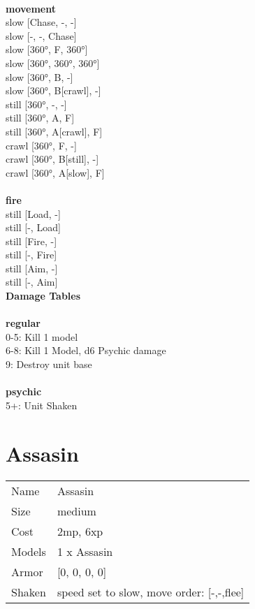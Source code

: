 \ \\ {\bf movement } \\
slow [Chase, -, -] \\
slow [-, -, Chase] \\
slow [360°, F, 360°] \\
slow [360°, 360°, 360°] \\
slow [360°, B, -] \\
slow [360°, B[crawl], -] \\
still [360°, -, -] \\
still [360°, A, F] \\
still [360°, A[crawl], F] \\
crawl [360°, F, -] \\
crawl [360°, B[still], -] \\
crawl [360°, A[slow], F] \\
\ \\ {\bf fire } \\
still [Load, -] \\
still [-, Load] \\
still [Fire, -] \\
still [-, Fire] \\
still [Aim, -] \\
still [-, Aim] \\


{\bf Damage Tables} \\
\ \\ {\bf regular } \\
0-5: Kill 1 model \\
6-8: Kill 1 Model, d6 Psychic damage \\
9: Destroy unit base \\
\ \\ {\bf psychic } \\
5+: Unit Shaken \\










\pagebreak\pagebreak

\section{ Assasin }

\begin{tabular}{ll}
  Name & Assasin \\
  Size & medium\\
  Cost & 2mp, 6xp\\
  Models & 1 x Assasin\\
  Armor & [0, 0, 0, 0]\\
  Shaken & speed set to slow, move order: [-,-,flee]\\
\end{tabular}

